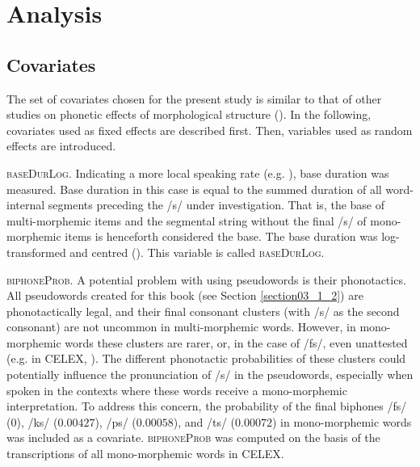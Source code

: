 \section{Analysis}\label{section04_2}

\subsection{Covariates}\label{section04_2_1}

The set of covariates chosen for the present study is similar to that of other studies on phonetic effects of morphological structure (\cite{Pluymaekers2005a, Pluymaekers2005b, Hanique2013Ernestus, Plag2017}). In the following, covariates used as fixed effects are described first. Then, variables used as random effects are introduced.

\textsc{baseDurLog}. Indicating a more local speaking rate (e.g. \cite{Plag2017}), base duration was measured. Base duration in this case is equal to the summed duration of all word-internal segments preceding the /s/ under investigation. That is, the base of multi-morphemic items and the segmental string without the final /s/ of mono-morphemic items is henceforth considered the base. The base duration was log-transformed and centred (\cite{Robinson2009, Afshartous2011, Winter2019}). This variable is called \textsc{baseDurLog}.

\textsc{biphoneProb}. A potential problem with using pseudowords is their phonotactics. All pseudowords created for this book (see Section \ref{section03_1_2}) are phonotactically legal, and their final consonant clusters (with /s/ as the second consonant) are not uncommon in multi-morphemic words. However, in mono-morphemic words these clusters are rarer, or, in the case of /fs/, even unattested (e.g. in CELEX, \cite{Baayen1995}). The different phonotactic probabilities of these clusters could potentially influence the pronunciation of /s/ in the pseudowords, especially when spoken in the contexts where these words receive a mono-morphemic interpretation. To address this concern, the probability of the final biphones /fs/ ($0$), /ks/ ($0.00427$), /ps/ ($0.00058$), and /ts/ ($0.00072$) in mono-morphemic words was included as a covariate. \textsc{biphoneProb} was computed on the basis of the transcriptions of all mono-morphemic words in CELEX.

